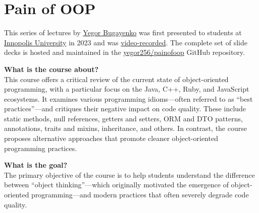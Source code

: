 \documentclass[nobrand,anonymous,nodate,nosecurity]{huawei}
\begin{document}



\section*{Pain of OOP}

This series of lectures by \href{https://www.yegor256.com}{Yegor Bugayenko} was first presented to students at \href{https://innopolis.university/en/}{Innopolis University} in 2023 and was \href{https://www.youtube.com/playlist?list=PLaIsQH4uc08ytf8POIIAkkR4ZsRq8DFiV}{video-recorded}.
The complete set of slide decks is hosted and maintained in the \href{https://github.com/yegor256/painofoop}{yegor256/painofoop} GitHub repository.

\textbf{What is the course about?}\\
This course offers a critical review of the current state of object-oriented programming, with a particular focus on the Java, C++, Ruby, and JavaScript ecosystems.
It examines various programming idioms—often referred to as ``best practices''---and critiques their negative impact on code quality.
These include static methods, null references, getters and setters, ORM and DTO patterns, annotations, traits and mixins, inheritance, and others.
In contrast, the course proposes alternative approaches that promote cleaner object-oriented programming practices.

\textbf{What is the goal?}\\
The primary objective of the course is to help students understand the difference between ``object thinking''---which originally motivated the emergence of object-oriented programming---and modern practices that often severely degrade code quality.
\end{document}
